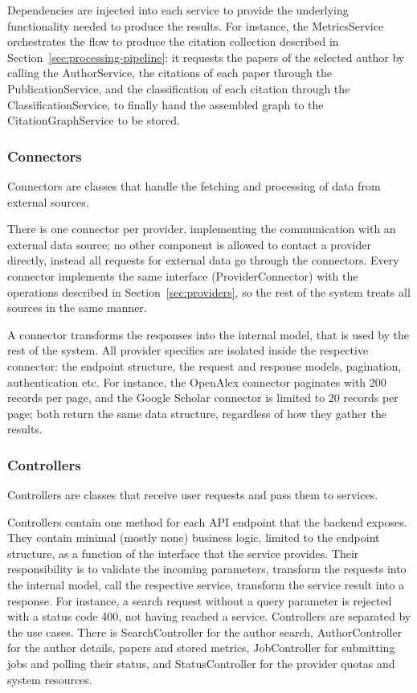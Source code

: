 Dependencies are injected into each service to provide the underlying functionality needed to produce the results.
For instance, the \textsf{MetricsService} orchestrates the flow to produce the citation collection described in Section~\ref{sec:processing-pipeline}: it requests the papers of the selected author by calling the \textsf{AuthorService}, the citations of each paper through the \textsf{PublicationService}, and the classification of each citation through the \textsf{ClassificationService}, to finally hand the assembled graph to the \textsf{CitationGraphService} to be stored.

\subsubsection{Connectors}

Connectors are classes that handle the fetching and processing of data from external sources.

There is one connector per provider, implementing the communication with an external data source; no other component is allowed to contact a provider directly, instead all requests for external data go through the connectors.
Every connector implements the same interface (\textsf{ProviderConnector}) with the operations described in Section~\ref{sec:providers}, so the rest of the system treats all sources in the same manner.

A connector transforms the responses into the internal model, that is used by the rest of the system.
All provider specifics are isolated inside the respective connector: the endpoint structure, the request and response models, pagination, authentication etc.
For instance, the \textsf{OpenAlex} connector paginates with 200 records per page, and the \textsf{Google Scholar} connector is limited to 20 records per page; both return the same data structure, regardless of how they gather the results.

\subsubsection{Controllers}

Controllers are classes that receive user requests and pass them to services.

Controllers contain one method for each API endpoint that the backend exposes.
They contain minimal (mostly none) business logic, limited to the endpoint structure, as a function of the interface that the service provides.
Their responsibility is to validate the incoming parameters, transform the requests into the internal model, call the respective service, transform the service result into a response.
For instance, a search request without a query parameter is rejected with a status code \textsf{400}, not having reached a service.
Controllers are separated by the use cases.
There is \textsf{SearchController} for the author search, \textsf{AuthorController} for the author details, papers and stored metrics, \textsf{JobController} for submitting jobs and polling their status, and \textsf{StatusController} for the provider quotas and system resources.

